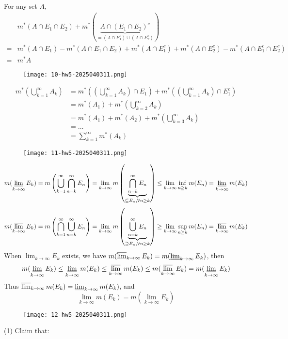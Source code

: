 For any set $A$,
\[
\begin{aligned}
 & m^{*}(A\cap E_1\cap E_2)+m^{*}(\underbrace{ A\cap(E_1\cap E_2)^{c} }_{ =(A\cap E_1^{c})\cup(A\cap E_2^{c}) })  \\
 = & m^{*}(A\cap E_1)-m^{*}(A\cap E_1\cap E_2)+m^{*}(A\cap E_1^{c})+m^{*}(A\cap E_2^{c})-m^{*}(A\cap E_1^{c}\cap E_2^{c}) \\
= & m^{*}A
\end{aligned}
\]
\begin{figure}[H]
\centering
\texttt{[image: 10-hw5-2025040311.png]}
\label{}
\end{figure}
\[
\begin{aligned}
m^{*}\left( \bigcup_{k=1}^{\infty} A_k \right) & =m^{*}\left( \left( \bigcup_{k=1}^{\infty} A_k \right)\cap E_1 \right)+m^{*}\left( \left( \bigcup_{k=1}^{\infty}  A_k \right)\cap E_1^{c} \right) \\
 & =m^{*}(A_1)+m^{*}\left( \bigcup_{k=2}^{\infty} A_k \right) \\
 & =m^{*}(A_1)+m^{*}(A_2)+m^{*}\left( \bigcup_{k=3}^{\infty}A_k  \right) \\
 & =\dots \\
 & =\sum_{k=1}^{\infty} m^{*}(A_{k})
\end{aligned}
\]
\begin{figure}[H]
\centering
\texttt{[image: 11-hw5-2025040311.png]}
\label{}
\end{figure}
\[
m(\varliminf_{ k \to \infty } E_k)=m\left( \bigcup_{k=1}^{\infty} \bigcap_{n=k}^{\infty} E_n \right)=\lim_{ k \to \infty } m\left(\underbrace{  \bigcap_{n=k}^{\infty} E_n }_{ \subseteq E_n,\forall n\geq k } \right)\leq \lim_{ k \to \infty } \inf_{n\geq k}m(E_n)=\varliminf_{ k \to \infty } m(E_k)
\]
\[
m(\varlimsup_{ k \to \infty } E_k)=m\left( \bigcap_{k=1}^{\infty} \bigcup_{n=k}^{\infty} E_n \right)=\lim_{ k \to \infty } m\left( \underbrace{ \bigcup_{n=k}^{\infty} E_n }_{ \supseteq E_n,\forall n\geq k } \right)\geq \lim_{ k \to \infty } \sup_{n\geq k}m(E_n)=\varlimsup_{ k \to \infty } m(E_k)
\]
When $\lim_{ k \to \infty }E_k$ exists, we have $m(\varlimsup_{ k \to \infty }E_k)=m(\varliminf_{ k \to \infty }E_k)$, then
\[
m(\varliminf_{ k \to \infty } E_k)\leq \varliminf_{ k \to \infty } m(E_k)\leq \varlimsup_{ k \to \infty } m(E_k)\leq m(\varlimsup_{ k \to \infty } E_k)=m(\varliminf_{ k \to \infty } E_k)
\]
Thus $\varlimsup_{ k \to \infty }m(E_k)=\varliminf_{ k \to \infty }m(E_k)$, and
\[
\lim_{ k \to \infty }m(E_k)=m(\lim_{ k \to \infty }E_k)
\]
\begin{figure}[H]
\centering
\texttt{[image: 12-hw5-2025040311.png]}
\label{}
\end{figure}
(1)
Claim that:

